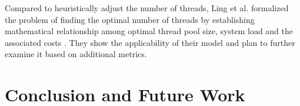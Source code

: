 \documentclass[conference]{IEEEtran}
\begin{document}
Compared to heuristically adjust the number of threads, Ling et al. formalized the problem of finding the optimal number of threads by establishing mathematical relationship among optimal thread pool size, system load and the associated costs \cite{ling2000analysis}. They show the applicability of their model and plan to further examine it based on additional metrics.
\section{Conclusion and Future Work}



\end{document}
